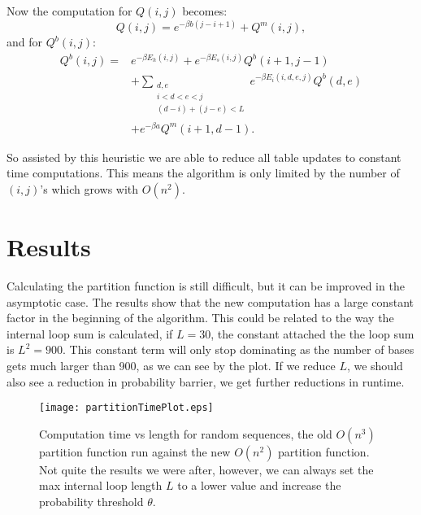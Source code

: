 Now the computation for $Q(i,j)$ becomes:
\begin{equation}
Q(i,j) = e^{-\beta b(j-i+1)} + Q^m(i, j),
\end{equation} 
and for $Q^b(i,j)$:
\begin{equation}
\begin{split}
 Q^b(i, j) =& e^{-\beta E_h(i,j)}+
e^{-\beta E_s(i, j)} Q^b(i+1, j-1) \\ 
& + \sum_{\substack{d,e \\ i < d< e< j\\ (d-i) + (j-e) < L}} e^{-\beta E_i(i, d, e, j)}Q^b(d,e) \\ 
& + e^{-\beta a}Q^m(i+1, d-1) .
\end{split}
\end{equation}

So assisted by this heuristic we are able to reduce all table updates
to constant time computations. This means the algorithm is only
limited by the number of $(i,j)$'s which grows with $O(n^2)$. 

\section{Results}

Calculating the partition function is still difficult, but it can be
improved in the asymptotic case. The results show that the new
computation has a large constant factor in the beginning of the
algorithm. This could be related to the way the internal loop sum is
calculated, if $L=30$, the constant attached the the loop sum is
$L^2=900$. This constant term will only stop dominating as the number
of bases gets much larger than 900, as we can see by the plot. If we
reduce $L$, we should also see a reduction in  probability barrier, we
get further reductions in runtime.

\begin{figure}
\centering
\texttt{[image: partitionTimePlot.eps]} 
\caption[Partition Function Speedups]{Computation time vs length for random sequences, the old
  $O(n^3)$ partition function run against the new $O(n^2)$ partition
  function. Not quite the results we were after, however, we can
  always set the max internal loop length $L$ to a lower value and
  increase the probability threshold $\theta$.}
\label{fig:pfResults}
\end{figure}


